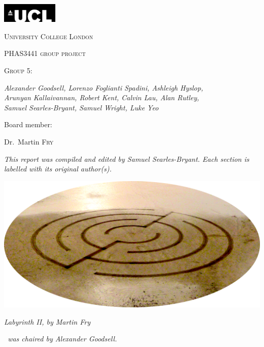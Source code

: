 \pagestyle{plain}

\begin{titlepage}
    \centering
    \includegraphics[width=0.2\textwidth]{Files/UCL}\par\vspace{1cm}
    {\scshape\LARGE University College London \par}
    \vspace{1cm}
    {\scshape PHAS3441 group project\par}
    {\scshape Group 5:~\teamname\par}
    \vspace{1.5cm}
    {\huge\bfseries {} \projectTitle\par}
    \vspace{2cm}
    {\Large\itshape Alexander Goodsell, Lorenzo Foglianti Spadini, Ashleigh Hyslop,\\ Arunyan Kallaivannan, Robert Kent, Calvin Lau, Alan Rutley,\\ Samuel Searles-Bryant, Samuel Wright, Luke Yeo\par}
    \vfill
    Board member:\par
    Dr.~Martin \textsc{Fry}

    \vfill

    {\large \thedate\par}
\end{titlepage}

{\centering
{\itshape This report was compiled and edited by Samuel Searles-Bryant. Each section is labelled with its original author(s).\par}
\vfill
\includegraphics[width=\textwidth]{Files/labyrinth_II_ellipse}\par
{\itshape \emph{Labyrinth II}, by Martin Fry\par}
\vfill
{\itshape \teamname~was chaired by Alexander Goodsell.\par}
}

\cleardoublepage

\tableofcontents
